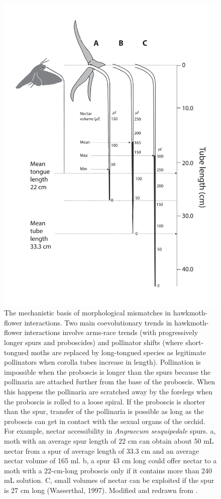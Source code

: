\documentclass[a4paper,12pt]{article}
\begin{document}
\begin{figure}[h!]
  \caption{The mechanistic basis of morphological mismatches in hawkmoth-flower interactions. Two main coevolutionary trends in hawkmoth-flower interactions involve arms-race trends (with progressively longer spurs and proboscides) and pollinator shifts (where short-tongued moths are replaced by long-tongued species as legitimate pollinators when corolla tubes increase in length). Pollination is impossible when the proboscis is longer than the spurs because the pollinaria are attached further from the base of the proboscis. When this happens the pollinaria are scratched away by the forelegs when the proboscis is rolled to a loose spiral. If the proboscis is shorter than the spur, transfer of the pollinaria is possible as long as the proboscis can get in contact with the sexual organs of the orchid. For example, nectar accessibility in \textit{Angraecum sesquipedale} spurs. a, moth with an average spur length of 22 cm can obtain about 50 mL nectar from a spur of average length of 33.3 cm and an average nectar volume of 165 ml. b, a spur 43 cm long could offer nectar to a moth with a 22-cm-long proboscis only if it contains more than 240 mL solution. C, small volumes of nectar can be exploited if the spur is 27 cm long (Wasserthal, 1997).
  Modified and redrawn from \citep{Arditti:2012}.}
  \label{Fig2}
  \begin{center}
    \includegraphics[width=12cm]{Fig2}
  \end{center}
\end{figure}
\end{document}
